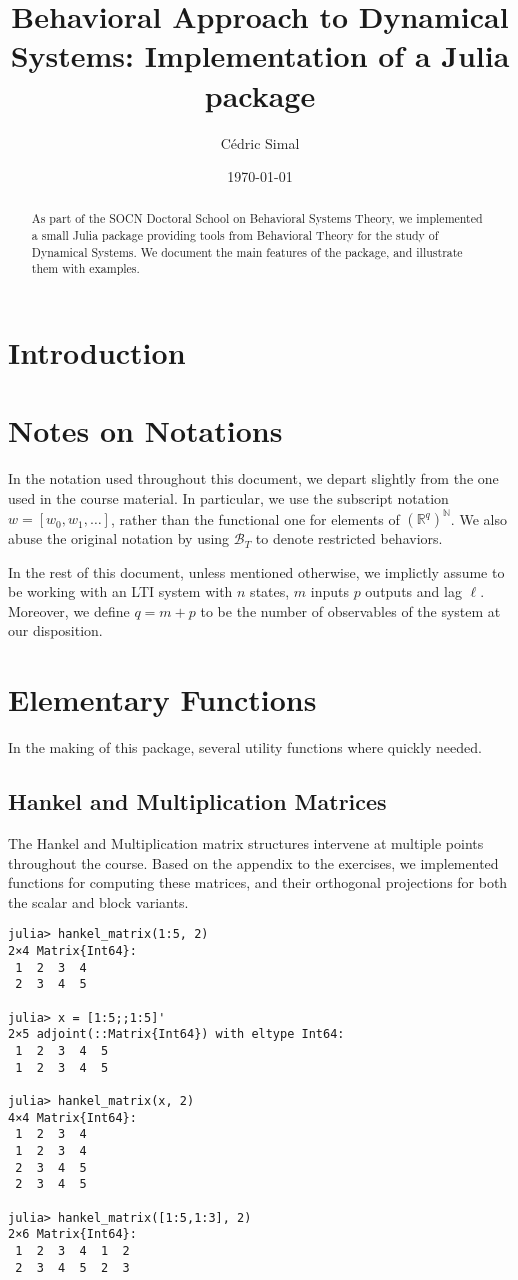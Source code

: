 \documentclass[11pt]{article}
\author{Cédric Simal}
\date{\today}
\title{Behavioral Approach to Dynamical Systems: Implementation of a Julia package}
\def\N{\mathbb{N}}
\def\R{\mathbb{R}}
\def\B{\mathscr{B}}
\begin{document}
\maketitle

\begin{abstract}
    As part of the SOCN Doctoral School on Behavioral Systems Theory, we implemented a small Julia package providing tools from Behavioral Theory for the study of Dynamical Systems. We document the main features of the package, and illustrate them with examples.
\end{abstract}

\section*{Introduction}

\section*{Notes on Notations}
In the notation used throughout this document, we depart slightly from the one used in the course material. In particular, we use the subscript notation $w = [w_0, w_1, \dots]$, rather than the functional one for elements of $(\R^q)^\N$. We also abuse the original notation by using $\B_T$ to denote restricted behaviors.

In the rest of this document, unless mentioned otherwise, we implictly assume to be working with an LTI system with $n$ states, $m$ inputs $p$ outputs and lag $\ell$. Moreover, we define $q=m+p$ to be the number of observables of the system at our disposition.

\section{Elementary Functions}
In the making of this package, several utility functions where quickly needed.
\subsection*{Hankel and Multiplication Matrices}
The Hankel and Multiplication matrix structures intervene at multiple points throughout the course. Based on the appendix to the exercises, we implemented functions for computing these matrices, and their orthogonal projections for both the scalar and block variants.

\begin{codebox}
\begin{verbatim}
julia> hankel_matrix(1:5, 2)
2×4 Matrix{Int64}:
 1  2  3  4
 2  3  4  5

julia> x = [1:5;;1:5]'
2×5 adjoint(::Matrix{Int64}) with eltype Int64:
 1  2  3  4  5
 1  2  3  4  5

julia> hankel_matrix(x, 2)
4×4 Matrix{Int64}:
 1  2  3  4
 1  2  3  4
 2  3  4  5
 2  3  4  5

julia> hankel_matrix([1:5,1:3], 2)
2×6 Matrix{Int64}:
 1  2  3  4  1  2
 2  3  4  5  2  3 
\end{verbatim}
\end{codebox}
\end{document}
